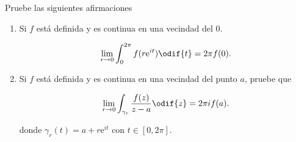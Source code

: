 \documentclass[../main.tex]{subfiles}
\begin{document}
\begin{problema}
    Pruebe las siguientes afirmaciones

    \begin{enumerate}
        \item Si \(f\) está definida y es continua en una vecindad del 0.

            \begin{equation*}
                \lim_{r \to 0} \int_{0}^{2\pi}f(r \mathrm{e}^{it})\odif{t} = 2\pi f(0).
            \end{equation*}

        \item Si \(f\) está definida y es continua en una vecindad del punto
            \(a\), pruebe que

            \begin{equation*}
                \lim_{r \to 0} \int_{\gamma_{r}}^{}\dfrac{f(z)}{z -
                a}\odif{z} = 2\pi if(a).
            \end{equation*}

            donde \(\gamma_{r}(t) = a + r \mathrm{e}^{it}\) con \(t\in [0, 2\pi]\).
    \end{enumerate}
\end{problema}
\end{document}
